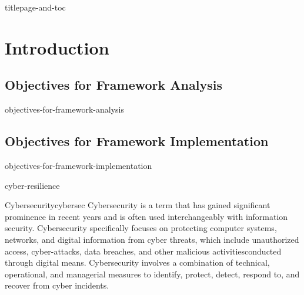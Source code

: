 \documentclass[12pt]{article}
\begin{document}
\setlength\parindent{15pt}

                    {titlepage-and-toc}

\pagestyle{fancy}
\fancyhf{}
\fancyhead[R]{\thepage}

     \section{Introduction}

               \subsection{Objectives for Framework Analysis}

                                        {objectives-for-framework-analysis}

               \subsection{Objectives for Framework Implementation}

                                        {objectives-for-framework-implementation}

                                        {cyber-resilience}
               
                                        \begin{center}
                                        \begin{minipage}{\textwidth}
                                        \begin{theo}{Cybersecurity}{cybersec}
                                        Cybersecurity is a term that has gained significant prominence in recent years and is often used interchangeably with information security. Cybersecurity specifically focuses on protecting computer                   systems, networks, and digital information from cyber threats, which include unauthorized access, cyber-attacks, data breaches, and other malicious activitiesconducted through digital means. Cybersecurity involves a combination of technical, operational, and managerial measures to identify, protect, detect, respond to, and recover from cyber incidents.
                                       \end{theo}
                                       \end{minipage}
                                       \end{center}
                                       \vspace{10pt}
                                       
\end{document}
